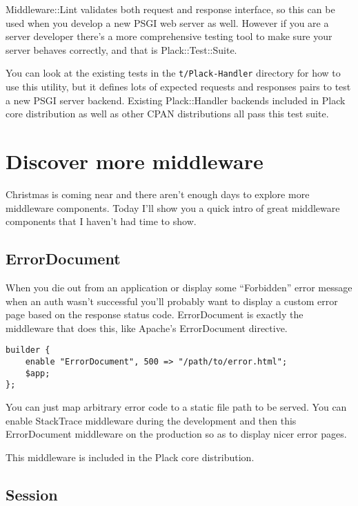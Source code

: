 Middleware::Lint validates both request and response interface, so this
can be used when you develop a new PSGI web server as well. However if
you are a server developer there's a more comprehensive testing tool to
make sure your server behaves correctly, and that is Plack::Test::Suite.

You can look at the existing tests in the \lstinline!t/Plack-Handler!
directory for how to use this utility, but it defines lots of expected
requests and responses pairs to test a new PSGI server backend. Existing
Plack::Handler backends included in Plack core distribution as well as
other CPAN distributions all pass this test suite.

\chapter{Discover more
middleware}\label{day-22-discover-more-middleware}

Christmas is coming near and there aren't enough days to explore more
middleware components. Today I'll show you a quick intro of great
middleware components that I haven't had time to show.

\section{ErrorDocument}\label{errordocument}

When you die out from an application or display some ``Forbidden'' error
message when an auth wasn't successful you'll probably want to display a
custom error page based on the response status code. ErrorDocument is
exactly the middleware that does this, like Apache's ErrorDocument
directive.

\begin{lstlisting}
builder {
    enable "ErrorDocument", 500 => "/path/to/error.html";
    $app;
};
\end{lstlisting}

You can just map arbitrary error code to a static file path to be
served. You can enable StackTrace middleware during the development and
then this ErrorDocument middleware on the production so as to display
nicer error pages.

This middleware is included in the Plack core distribution.

\section{Session}\label{session}


